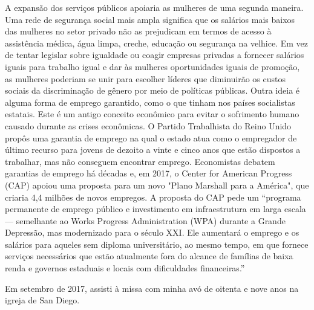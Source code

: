 A expansão dos serviços públicos apoiaria as mulheres de uma segunda maneira. Uma rede de segurança social mais ampla significa que os salários mais baixos das mulheres no setor privado não as prejudicam em termos de acesso à assistência médica, água limpa, creche, educação ou segurança na velhice. Em vez de tentar legislar sobre igualdade ou coagir empresas privadas a fornecer salários iguais para trabalho igual e dar às mulheres oportunidades iguais de promoção, as mulheres poderiam se unir para escolher líderes que diminuirão os custos sociais da discriminação de gênero por meio de políticas públicas. Outra ideia é alguma forma de emprego garantido, como o que tinham nos países socialistas estatais. Este é um antigo conceito econômico para evitar o sofrimento humano causado durante as crises econômicas. O Partido Trabalhista do Reino Unido propôs uma garantia de emprego na qual o estado atua como o empregador de último recurso para jovens de dezoito a vinte e cinco anos que estão dispostos a trabalhar, mas não conseguem encontrar emprego. Economistas debatem garantias de emprego há décadas e, em 2017, o Center for American Progress (CAP) apoiou uma proposta para um novo "Plano Marshall para a América", que criaria 4,4 milhões de novos empregos. A proposta do CAP pede um “programa permanente de emprego público e investimento em infraestrutura em larga escala — semelhante ao Works Progress Administration (WPA) durante a Grande Depressão, mas modernizado para o século XXI. Ele aumentará o emprego e os salários para aqueles sem diploma universitário, ao mesmo tempo, em que fornece serviços necessários que estão atualmente fora do alcance de famílias de baixa renda e governos estaduais e locais com dificuldades financeiras.”
 \par 
Em setembro de 2017, assisti à missa com minha avó de oitenta e nove anos na igreja de San Diego.
 \par 
